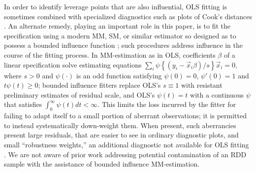In order to identify leverage points that are also influential,
OLS fitting is sometimes combined with specialized diagnostics such as
plots of Cook's distances
 \citeyearpar{cook1982residuals}. An alternate remedy, playing
 an important role in this paper, is to fit the
 specification using a modern MM,  SM, or similar estimator so designed
 as to possess a bounded influence function
 \citep{yohaiZamar1997locallyrobustMestimates}; such procedures address influence
 in the course of the fitting process.
In MM-estimation as in OLS,
coefficients $\beta$ of a linear specification solve estimating equations
$\sum_{i} \psi\left\{ ({y}_{i} -
\vec{x}_{i}\beta)/s \right\} \vec{x}_{i} =0$, where $s>0$ and
$\psi(\cdot)$ is an odd function satisfying $\psi(0)=0$,
$\psi'(0)=1$ and $t\psi(t)\geq 0$; bounded influence fitters replace OLS's $s\equiv 1$ with resistant preliminary
estimates of residual scale, and OLS's $\psi(t) = t$ with a continuous $\psi$
that satisfies $\int_{0}^{\infty}\psi(t)dt < \infty$. This limits
the loss incurred by the fitter for failing to adapt itself to a small
portion of aberrant observations;
it is permitted to instead systematically down-weight them. When
present, such aberrancies present large residuals, that are easier to
see in ordinary diagnostic plots, and small
``robustness weights,'' an additional diagnostic not available for OLS fitting
\citep{maronna2006robust}.  We are not aware of prior work addressing
potential contamination of an RDD sample with the assistance of
bounded influence MM-estimation.


